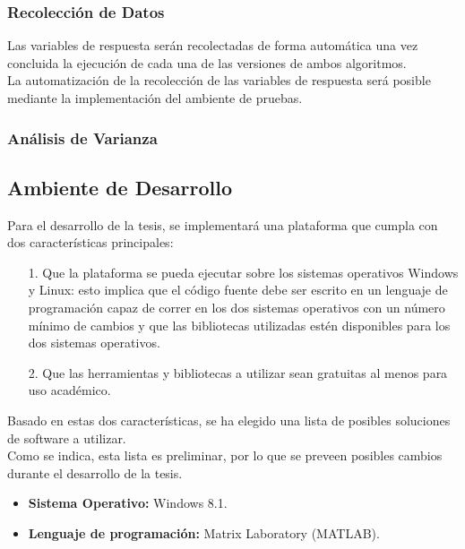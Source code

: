 \subsubsection{Recolecci\'on de Datos}
Las variables de respuesta ser\'an recolectadas de forma autom\'atica una vez concluida la ejecuci\'on de cada una de las versiones de ambos algoritmos.\\
La automatizaci\'on de la recolecci\'on de las variables de respuesta ser\'a posible mediante la implementaci\'on del ambiente de pruebas.
\subsubsection{An\'alisis de Varianza}
\subsection{Ambiente de Desarrollo}
Para el desarrollo de la tesis, se implementar\'a una plataforma que cumpla con dos caracter\'isticas principales:
\begin{itemize}
\item [1.] Que la plataforma se pueda ejecutar sobre los sistemas operativos Windows y Linux: esto implica que el c\'odigo fuente debe ser escrito en un lenguaje de programaci\'on capaz de correr en los dos sistemas operativos con un n\'umero m\'inimo de cambios y que las bibliotecas utilizadas est\'en disponibles para los dos sistemas operativos.
\item [2.] Que las herramientas y bibliotecas a utilizar sean gratuitas al menos para uso acad\'emico.
\end{itemize}
Basado en estas dos caracter\'isticas, se ha elegido una lista de posibles soluciones de software a utilizar.\\
Como se indica, esta lista es preliminar, por lo que se preveen posibles cambios durante el desarrollo de la tesis.
\begin{itemize}
\item \textbf{Sistema Operativo:} Windows 8.1.
\item \textbf{Lenguaje de programaci\'on:} Matrix Laboratory (MATLAB).
\end{itemize}
